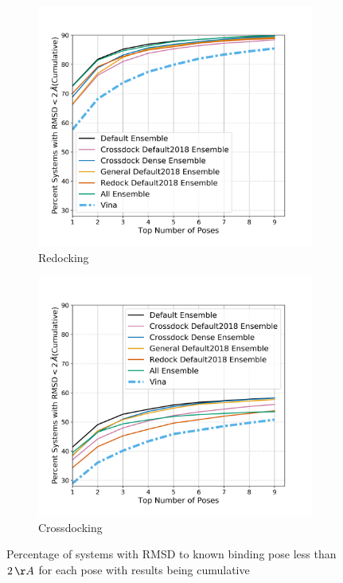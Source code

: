 \documentclass[journal=jcisd8,manuscript=article]{achemso}
\begin{document}
\begin{figure}
	\begin{subfigure}[b]{0.48\textwidth}
		\centering
		\includegraphics[width=\textwidth]{figures/redocking/rescore_ensembles_line.png}
		\caption{Redocking}
		\label{fig:RescoreEnsembleRedock}
        \end{subfigure}    
	\begin{subfigure}[b]{0.48\textwidth} 
		\centering
		\includegraphics[width=\textwidth]{figures/crossdocking/rescore_ensembles_line.png}
		\caption{Crossdocking}
		\label{fig:RescoreEnsembleCrossdock}
        \end{subfigure}    
	\caption{Percentage of systems with RMSD to known binding pose less than $2\,\AA$ for each pose with results being cumulative}
	\label{fig:RescoreEnsemble}
\end{figure}    
\end{document}
